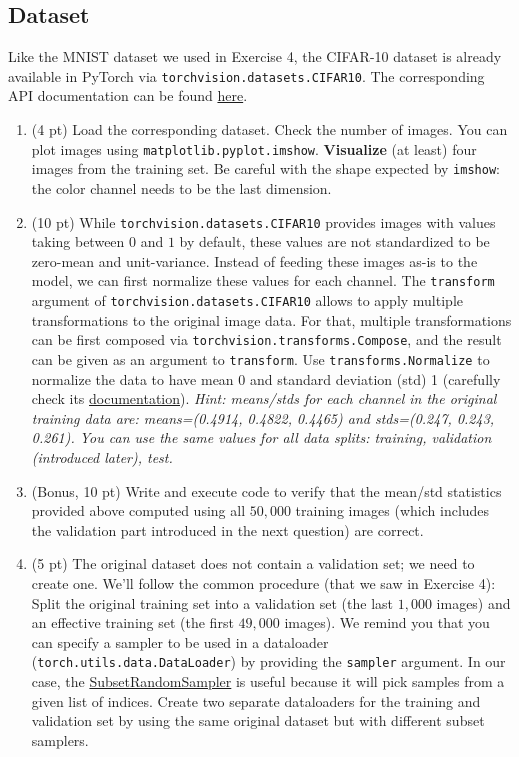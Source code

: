 \documentclass[a4paper,11pt]{article}
\begin{document}
\subsection{Dataset}
Like the MNIST dataset we used in Exercise 4, the CIFAR-10 dataset is already available in PyTorch via \texttt{torchvision.datasets.CIFAR10}. The corresponding API documentation can be found \href{https://pytorch.org/vision/stable/generated/torchvision.datasets.CIFAR10.html}{here}.
\begin{enumerate}
\item (4 pt) Load the corresponding dataset. Check the number of images.
You can plot images using \texttt{matplotlib.pyplot.imshow}. \textbf{Visualize} (at least) four images from the training set.
Be careful with the shape expected by \texttt{imshow}: the color channel needs to be the last dimension.

\item (10 pt) While \texttt{torchvision.datasets.CIFAR10} provides images with values taking between $0$ and $1$ by default,
these values are not standardized to be zero-mean and unit-variance.
Instead of feeding these images as-is to the model, we can first normalize these values for each channel.
The \texttt{transform} argument of \texttt{torchvision.datasets.CIFAR10} allows to
apply multiple transformations to the original image data.
For that, multiple transformations can be first composed via \texttt{torchvision.transforms.Compose},
and the result can be given as an argument to \texttt{transform}.
Use \texttt{transforms.Normalize} to normalize the data to have mean 0 and standard deviation (std) 1 (carefully check its \href{https://pytorch.org/vision/0.8/transforms.html}{documentation}). \textit{Hint: means/stds for each channel in the original training data are: means=(0.4914, 0.4822, 0.4465) and stds=(0.247, 0.243, 0.261). You can use the same values for all data splits: training, validation (introduced later), test.}

\item (Bonus, 10 pt) Write and execute code to verify that the mean/std statistics provided above computed using all $50,000$ training images (which includes the validation part introduced in the next question) are correct.

\item (5 pt) The original dataset does not contain a validation set; we need to create one. We'll follow the common procedure (that we saw in Exercise 4): Split the original training set into a validation set (the last $1,000$ images) and an effective training set (the first $49,000$ images). We remind you that you can specify a sampler to be used in a dataloader (\texttt{torch.utils.data.DataLoader}) by providing the \texttt{sampler} argument. In our case, the \href{https://pytorch.org/docs/master/data.html#torch.utils.data.SubsetRandomSampler}{SubsetRandomSampler} is useful because it will pick samples from a given list of indices. Create two separate dataloaders for the training and validation set by using the same original dataset but with different subset samplers.
\end{enumerate}
\end{document}
